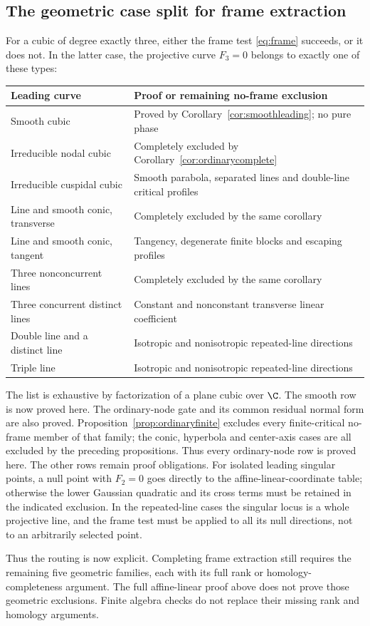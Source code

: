 \subsection{The geometric case split for frame extraction}

For a cubic of degree exactly three, either the frame test
\eqref{eq:frame} succeeds, or it does not. In the latter case,
the projective curve $F_3=0$ belongs to exactly one of these types:
\begin{center}\small
\begin{tabular}{@{}p{}p{}@{}}
\toprule
Leading curve & Proof or remaining no-frame exclusion\\
\midrule
Smooth cubic & Proved by Corollary~\ref{cor:smoothleading}; no pure phase\\
Irreducible nodal cubic & Completely excluded by Corollary~\ref{cor:ordinarycomplete}\\
Irreducible cuspidal cubic & Smooth parabola, separated lines and double-line critical profiles\\
Line and smooth conic, transverse & Completely excluded by the same corollary\\
Line and smooth conic, tangent & Tangency, degenerate finite blocks and escaping profiles\\
Three nonconcurrent lines & Completely excluded by the same corollary\\
Three concurrent distinct lines & Constant and nonconstant transverse linear coefficient\\
Double line and a distinct line & Isotropic and nonisotropic repeated-line directions\\
Triple line & Isotropic and nonisotropic repeated-line directions\\
\bottomrule
\end{tabular}
\end{center}
The list is exhaustive by factorization of a plane cubic over $\C$.
The smooth row is now proved here. The ordinary-node gate and its
common residual normal form are also proved. Proposition~\ref{prop:ordinaryfinite}
excludes every finite-critical no-frame member of that family; the
conic, hyperbola and center-axis cases are all excluded by the
preceding propositions. Thus every ordinary-node row is proved here. The other rows remain
proof obligations. For isolated leading singular points, a null
point with $F_2=0$ goes directly to the affine-linear-coordinate table;
otherwise the lower Gaussian quadratic and its cross terms must be
retained in the indicated exclusion. In the repeated-line cases the
singular locus is a whole projective line, and the frame test must be
applied to all its null directions, not to an arbitrarily selected point.

Thus the routing is now explicit. Completing frame extraction still
requires the remaining five geometric families, each with its full
rank or homology-completeness argument. The full affine-linear proof above does not prove those geometric
exclusions. Finite algebra checks do not replace their missing
rank and homology arguments.
